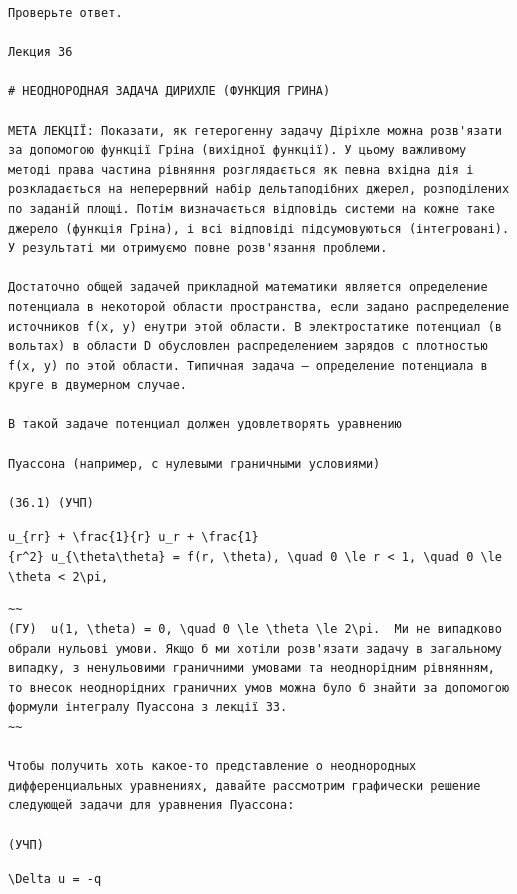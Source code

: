 \documentclass[
  ukrainian,
]{article}
\begin{document}
\begin{verbatim}
Проверьте ответ.

Лекция 36

# НЕОДНОРОДНАЯ ЗАДАЧА ДИРИХЛЕ (ФУНКЦИЯ ГРИНА)

МЕТА ЛЕКЦІЇ: Показати, як гетерогенну задачу Діріхле можна розв'язати за допомогою функції Гріна (вихідної функції). У цьому важливому методі права частина рівняння розглядається як певна вхідна дія і розкладається на неперервний набір дельтаподібних джерел, розподілених по заданій площі. Потім визначається відповідь системи на кожне таке джерело (функція Гріна), і всі відповіді підсумовуються (інтегровані). У результаті ми отримуємо повне розв'язання проблеми.

Достаточно общей задачей прикладной математики является определение потенциала в некоторой области пространства, если задано распределение источников f(x, y) енутри этой области. В электростатике потенциал (в вольтах) в области D обусловлен распределением зарядов с плотностью f(x, y) по этой области. Типичная задача — определение потенциала в круге в двумерном случае.

В такой задаче потенциал должен удовлетворять уравнению

Пуассона (например, с нулевыми граничными условиями)

(36.1) (УЧП)
\end{verbatim}

\texttt{u\_\{rr\}\ +\ \textbackslash{}frac\{1\}\{r\}\ u\_r\ +\ \textbackslash{}frac\{1\}\{r\^{}2\}\ u\_\{\textbackslash{}theta\textbackslash{}theta\}\ =\ f(r,\ \textbackslash{}theta),\ \textbackslash{}quad\ 0\ \textbackslash{}le\ r\ \textless{}\ 1,\ \textbackslash{}quad\ 0\ \textbackslash{}le\ \textbackslash{}theta\ \textless{}\ 2\textbackslash{}pi,}

\begin{verbatim}
~~
(ГУ)  u(1, \theta) = 0, \quad 0 \le \theta \le 2\pi.  Ми не випадково обрали нульові умови. Якщо б ми хотіли розв'язати задачу в загальному випадку, з ненульовими граничними умовами та неоднорідним рівнянням, то внесок неоднорідних граничних умов можна було б знайти за допомогою формули інтегралу Пуассона з лекції 33.
~~

Чтобы получить хоть какое-то представление о неоднородных дифференциальных уравнениях, давайте рассмотрим графически решение следующей задачи для уравнения Пуассона:

(УЧП)
\end{verbatim}

\texttt{\textbackslash{}Delta\ u\ =\ -q}
\end{document}
